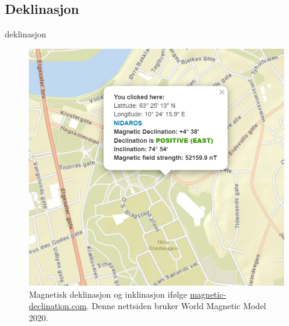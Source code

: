 \subsection{Deklinasjon}

{deklinasjon}

\begin{figure}
    \centering
    \includegraphics{img/WMM.png}
    \caption{Magnetisk deklinasjon og inklinasjon ifølge \href{https://www.magnetic-declination.com/}{magnetic-declination.com}. Denne nettsiden bruker World Magnetic Model 2020.}
    \label{fig:WMM}
\end{figure}
